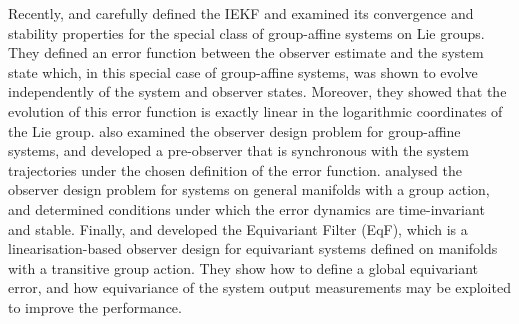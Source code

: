 \documentclass{article}
\begin{document}
Recently, \cite{barrau2016invariant} and \cite{barrau2018invariant} carefully defined the IEKF and examined its convergence and stability properties for the special class of group-affine systems on Lie groups.
They defined an error function between the observer estimate and the system state which, in this special case of group-affine systems, was shown to evolve independently of the system and observer states.
Moreover, they showed that the evolution of this error function is exactly linear in the logarithmic coordinates of the Lie group.
\cite{van2021autonomous} also examined the observer design problem for group-affine systems, and developed a pre-observer that is synchronous with the system trajectories under the chosen definition of the error function.
\cite{joshi2019bundle} analysed the observer design problem for systems on general manifolds with a group action, and determined conditions under which the error dynamics are time-invariant and stable.
Finally, \cite{van2020equivariant} and \cite{mahony2021observer} developed the Equivariant Filter (EqF), which is a linearisation-based observer design for equivariant systems defined on manifolds with a transitive group action.  
They show how to define a global equivariant error, and how equivariance of the system output measurements may be exploited to improve the performance.
\end{document}
